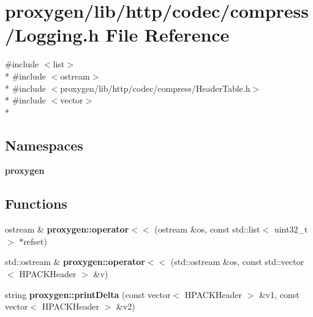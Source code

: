 \section{proxygen/lib/http/codec/compress/\+Logging.h File Reference}
\label{http_2codec_2compress_2Logging_8h}
{\ttfamily \#include $<$list$>$}\\*
{\ttfamily \#include $<$ostream$>$}\\*
{\ttfamily \#include $<$proxygen/lib/http/codec/compress/\+Header\+Table.\+h$>$}\\*
{\ttfamily \#include $<$vector$>$}\\*
\subsection*{Namespaces}
\begin{DoxyCompactItemize}
\item 
 {\bf proxygen}
\end{DoxyCompactItemize}
\subsection*{Functions}
\begin{DoxyCompactItemize}
\item 
ostream \& {\bf proxygen\+::operator$<$$<$} (ostream \&os, const std\+::list$<$ uint32\+\_\+t $>$ $\ast$refset)
\item 
std\+::ostream \& {\bf proxygen\+::operator$<$$<$} (std\+::ostream \&os, const std\+::vector$<$ H\+P\+A\+C\+K\+Header $>$ \&v)
\item 
string {\bf proxygen\+::print\+Delta} (const vector$<$ H\+P\+A\+C\+K\+Header $>$ \&v1, const vector$<$ H\+P\+A\+C\+K\+Header $>$ \&v2)
\end{DoxyCompactItemize}
